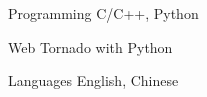 


\begin{cvskills}


\cvskill
{Programming} %
{C/C++, Python} %


\cvskill
{Web} %
{Tornado with Python} %


\cvskill
{Languages} %
{English, Chinese} %


\end{cvskills}